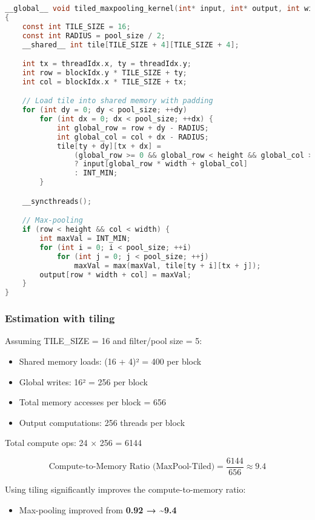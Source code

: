 \documentclass[11pt]{article}
\begin{document}
\begin{lstlisting}[language=C,numbers=none]
__global__ void tiled_maxpooling_kernel(int* input, int* output, int width, int height, int pool_size)
{
    const int TILE_SIZE = 16;
    const int RADIUS = pool_size / 2;
    __shared__ int tile[TILE_SIZE + 4][TILE_SIZE + 4];

    int tx = threadIdx.x, ty = threadIdx.y;
    int row = blockIdx.y * TILE_SIZE + ty;
    int col = blockIdx.x * TILE_SIZE + tx;

    // Load tile into shared memory with padding
    for (int dy = 0; dy < pool_size; ++dy)
        for (int dx = 0; dx < pool_size; ++dx) {
            int global_row = row + dy - RADIUS;
            int global_col = col + dx - RADIUS;
            tile[ty + dy][tx + dx] =
                (global_row >= 0 && global_row < height && global_col >= 0 && global_col < width)
                ? input[global_row * width + global_col]
                : INT_MIN;
        }

    __syncthreads();

    // Max-pooling
    if (row < height && col < width) {
        int maxVal = INT_MIN;
        for (int i = 0; i < pool_size; ++i)
            for (int j = 0; j < pool_size; ++j)
                maxVal = max(maxVal, tile[ty + i][tx + j]);
        output[row * width + col] = maxVal;
    }
}
\end{lstlisting}
\subsubsection{Estimation with tiling}
\label{sec:org35eb36b}

Assuming TILE\_SIZE = 16 and filter/pool size = 5:
\begin{itemize}
\item Shared memory loads: (16 + 4)² = 400 per block
\item Global writes: 16² = 256 per block
\item Total memory accesses per block = 656
\item Output computations: 256 threads per block
\end{itemize}

Total compute ops: 24 × 256 = 6144

\[
\text{Compute-to-Memory Ratio (MaxPool-Tiled)} = \frac{6144}{656} \approx 9.4
\]

Using tiling significantly improves the compute-to-memory ratio:
\begin{itemize}
\item Max-pooling improved from \textbf{\textbf{0.92 → \textasciitilde{}9.4}}
\end{itemize}
\end{document}
